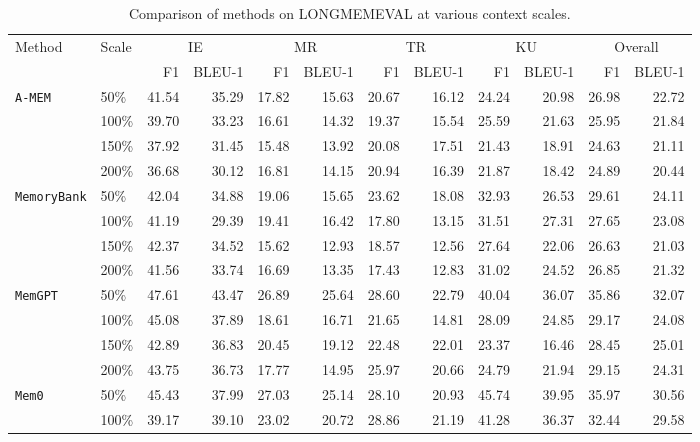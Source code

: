 \begin{table}[]
\centering
\caption{Comparison of methods on LONGMEMEVAL at various context scales.}
\small
\begin{tabular}{l|l|r|r|r|r|r|r|r|r|r|r}
\toprule
\multirow{2}{*}{Method} & \multirow{2}{*}{Scale} & \multicolumn{2}{c|}{IE}  & \multicolumn{2}{c|}{MR}  & \multicolumn{2}{c|}{TR}  & \multicolumn{2}{c|}{KU} & \multicolumn{2}{c}{Overall} \\ \cline{3-12}
& & F1 & BLEU-1 & F1 & BLEU-1 & F1 & BLEU-1 & F1 & BLEU-1 & F1 & BLEU-1 \\ \midrule
\multirow{4}{*}{\tt A-MEM} & 50\% & 41.54 & 35.29 & 17.82 & 15.63 & 20.67 & 16.12 & 24.24 & 20.98 & 26.98 & 22.72 \\
& 100\% & 39.70 & 33.23 & 16.61 & 14.32 & 19.37 & 15.54 & 25.59 & 21.63 & 25.95 & 21.84 \\
& 150\% & 37.92 & 31.45 & 15.48 & 13.92 & 20.08 & 17.51 & 21.43 & 18.91 & 24.63 & 21.11 \\
& 200\% & 36.68 & 30.12 & 16.81 & 14.15 & 20.94 & 16.39 & 21.87 & 18.42 & 24.89 & 20.44 \\
\midrule
\multirow{4}{*}{\tt MemoryBank} & 50\% & 42.04 & 34.88 & 19.06 & 15.65 & 23.62 & 18.08 & 32.93 & 26.53 & 29.61 & 24.11 \\
& 100\% & 41.19 &29.39& 19.41 & 16.42 & 17.80 & 13.15 & 31.51 & 27.31 & 27.65 & 23.08 \\
& 150\% & 42.37 & 34.52 & 15.62 & 12.93 & 18.57 & 12.56 & 27.64 & 22.06 & 26.63 & 21.03 \\
& 200\% & 41.56 & 33.74 & 16.69 & 13.35 & 17.43 & 12.83 & 31.02 & 24.52 & 26.85 & 21.32 \\
\midrule
\multirow{4}{*}{\tt MemGPT} & 50\% & 47.61 & 43.47 & 26.89 & 25.64 & 28.60 & 22.79 & 40.04 & 36.07 & 35.86 & 32.07 \\
& 100\% & 45.08 & 37.89 & 18.61 & 16.71 & 21.65 & 14.81 & 28.09 & 24.85 & 29.17 & 24.08 \\
& 150\% & 42.89 & 36.83 & 20.45 & 19.12 & 22.48 & 22.01 & 23.37 & 16.46 & 28.45 & 25.01 \\
& 200\% & 43.75 & 36.73 & 17.77 & 14.95 & 25.97 & 20.66 & 24.79 & 21.94 & 29.15 & 24.31 \\
\midrule
\multirow{4}{*}{\tt Mem0} & 50\% & 45.43 & 37.99 & 27.03 & 25.14 & 28.10 & 20.93 & 45.74 & 39.95 & 35.97 & 30.56 \\
& 100\% & 39.17 & 39.10 & 23.02 & 20.72 & 28.86 & 21.19 & 41.28 & 36.37 & 32.44 & 29.58 \\

\end{tabular}
\end{table}
